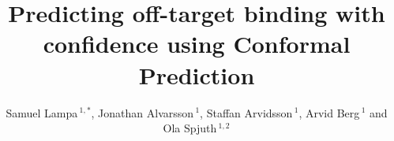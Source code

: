 \documentclass[utf8]{frontiersSCNS} %
\def\firstAuthorLast{Lampa {et~al.}} %
\def\Authors{Samuel Lampa\,$^{1,*}$, Jonathan Alvarsson\,$^{1}$, Staffan Arvidsson\,$^{1}$, Arvid Berg\,$^{1}$ and Ola Spjuth\,$^{1,2}$}
\begin{document}
\onecolumn
{}

\title[Predicting off-target binding with confidence using Conformal Prediction]{Predicting off-target binding with confidence using Conformal Prediction}

\author[\firstAuthorLast ]{\Authors} %
\address{} %
\correspondance{} %

\extraAuth{}%


\maketitle
\end{document}
